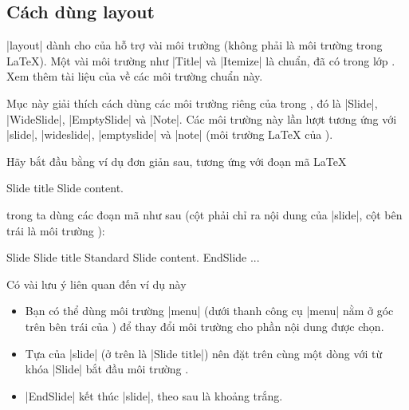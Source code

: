 \subsection{\texorpdfstring{Cách dùng layout}{Su dung layout the nao}}%

|layout| dành cho \LyX{} của  hỗ trợ vài môi trường (không phải
là môi trường trong \LaTeX{}). Một vài môi trường như |Title| và |Itemize|
là chuẩn, đã có trong lớp . Xem thêm tài liệu của \LyX{}
về các môi trường chuẩn này.

Mục này giải thích cách dùng các môi trường riêng của 
trong \LyX, đó là |Slide|, |WideSlide|, |EmptySlide| và |Note|.
Các môi trường này lần lượt tương ứng với |slide|, |wideslide|,
|emptyslide| và |note| (môi trường \LaTeX{} của ).

Hãy bắt đầu bằng ví dụ đơn giản sau, tương ứng với đoạn mã \LaTeX{}
\begin{example}
 \begin{slide}{Slide title}
   Slide content.
 \end{slide}
\end{example}
trong \LyX{} ta dùng các đoạn mã như sau (cột phải chỉ ra nội dung của |slide|,
cột bên trái là môi trường \LyX):
\begin{example}
  Slide         Slide title
  Standard      Slide content.
  EndSlide
  ...
\end{example}
Có vài lưu ý liên quan đến ví dụ này
\begin{itemize}[leftmargin=0pt,itemsep=0pt,parsep=0pt]
\item
Bạn có thể dùng môi trường |menu| (dưới thanh công cụ |menu| nằm ở
góc trên bên trái của \LyX) để thay đổi môi trường cho phần nội dung được chọn.
\item
Tựa của |slide| (ở trên là |Slide title|) nên đặt trên cùng một dòng với
từ khóa |Slide| bắt đầu môi trường \LyX.
\item%
|EndSlide| kết thúc |slide|, theo sau là khoảng trắng.
\end{itemize}

